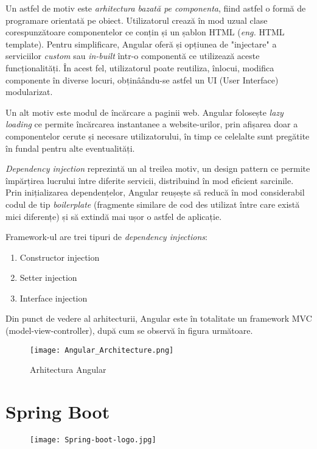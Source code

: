 Un astfel de motiv este \textit{arhitectura bazată pe componenta}, fiind astfel o formă de programare orientată pe obiect. Utilizatorul crează în mod uzual clase corespunzătoare componentelor ce conțin și un șablon HTML (\textit{eng.} HTML template). Pentru simplificare, Angular oferă și opțiunea de "injectare" a serviciilor \textit{custom} sau \textit{in-built} într-o componentă ce utilizează aceste funcționalități. În acest fel, utilizatorul poate reutiliza, înlocui, modifica componente în diverse locuri, obținâându-se astfel un UI (User Interface) modularizat.

Un alt motiv este modul de încărcare a paginii web. Angular folosește \textit{lazy loading} ce permite încărcarea instantanee a website-urilor, prin afișarea doar a componentelor cerute și necesare utilizatorului, în timp ce celelalte sunt pregătite în fundal pentru alte eventualități.

\textit{Dependency injection} reprezintă un al treilea motiv, un design pattern ce permite împărțirea lucrului între diferite servicii, distribuind în mod eficient sarcinile. Prin inițializarea dependențelor, Angular reușește să reducă în mod considerabil codul de tip \textit{boilerplate} (fragmente similare de cod des utilizat între care există mici diferențe) și să extindă mai ușor o astfel de aplicație.

Framework-ul are trei tipuri de \textit{dependency injections}:
\begin{enumerate}
	\item Constructor injection
	\item Setter injection
	\item Interface injection
\end{enumerate}

Din punct de vedere al arhitecturii, Angular este în totalitate un framework MVC (model-view-controller), după cum se observă în figura următoare.

\begin{figure}[H]
	\centering
	\texttt{[image: Angular\_Architecture.png]}
	\caption{Arhitectura Angular \cite{angular-architecture-diagram}}
\end{figure}

\section{Spring Boot}
\begin{figure}[H]
	\centering
	\texttt{[image: Spring-boot-logo.jpg]}
\end{figure}

